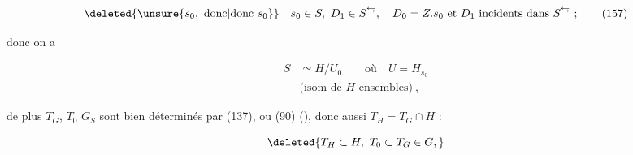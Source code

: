 \[
\deleted{\unsure{s_0,\ \text{donc}|\text{donc }s_0}}\quad s_0\in S,\ D_1\in S^{\leftrightarrows},\quad D_0=Z.s_0\ \text{et }D_1\ \text{incidents dans }S^{\leftrightarrows}\ ;\tag*{(157)}
\]

donc on a

\[
\begin{aligned}
S&\simeq H/U_0\qquad\text{où}\quad U=H_{s_0}\\
&\text{(isom de }H\text{-ensembles)}\ ,
\end{aligned}\tag*{(158)}
\]

 de plus $T_G$, $T_0$  $G_S$ sont bien déterminés par (137),  ou (90) (), donc aussi $T_H=T_G\cap H$ :

\[
\deleted{T_H\subset H,\ T_0\subset T_G\in G,}
\]

